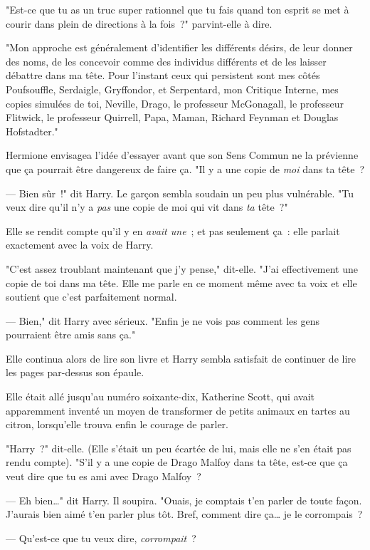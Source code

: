 "Est-ce que tu as un truc super rationnel que tu fais quand ton esprit se met à courir dans plein de directions à la fois~?" parvint-elle à dire.

"Mon approche est généralement d'identifier les différents désirs, de leur donner des noms, de les concevoir comme des individus différents et de les laisser débattre dans ma tête. Pour l'instant ceux qui persistent sont mes côtés Poufsouffle, Serdaigle, Gryffondor, et Serpentard, mon Critique Interne, mes copies simulées de toi, Neville, Drago, le professeur McGonagall, le professeur Flitwick, le professeur Quirrell, Papa, Maman, Richard Feynman et Douglas Hofstadter."

Hermione envisagea l'idée d'essayer avant que son Sens Commun ne la prévienne que ça pourrait être dangereux de faire ça. "Il y a une copie de \emph{moi} dans ta tête~?

--- Bien sûr~!" dit Harry. Le garçon sembla soudain un peu plus vulnérable. "Tu veux dire qu'il n'y a \emph{pas} une copie de moi qui vit dans \emph{ta} tête~?"

Elle se rendit compte qu'il y en \emph{avait une}~; et pas seulement ça~: elle parlait exactement avec la voix de Harry.

"C'est assez troublant maintenant que j'y pense," dit-elle. "J'ai effectivement une copie de toi dans ma tête. Elle me parle en ce moment même avec ta voix et elle soutient que c'est parfaitement normal.

--- Bien," dit Harry avec sérieux. "Enfin je ne vois pas comment les gens pourraient être amis sans ça."

Elle continua alors de lire son livre et Harry sembla satisfait de continuer de lire les pages par-dessus son épaule.

Elle était allé jusqu'au numéro soixante-dix, Katherine Scott, qui avait apparemment inventé un moyen de transformer de petits animaux en tartes au citron, lorsqu'elle trouva enfin le courage de parler.

"Harry~?" dit-elle. (Elle s'était un peu écartée de lui, mais elle ne s'en était pas rendu compte). "S'il y a une copie de Drago Malfoy dans ta tête, est-ce que ça veut dire que tu es ami avec Drago Malfoy~?

--- Eh bien…" dit Harry. Il soupira. "Ouais, je comptais t'en parler de toute façon. J'aurais bien aimé t'en parler plus tôt. Bref, comment dire ça… je le corrompais~?

--- Qu'est-ce que tu veux dire, \emph{corrompait}~?

